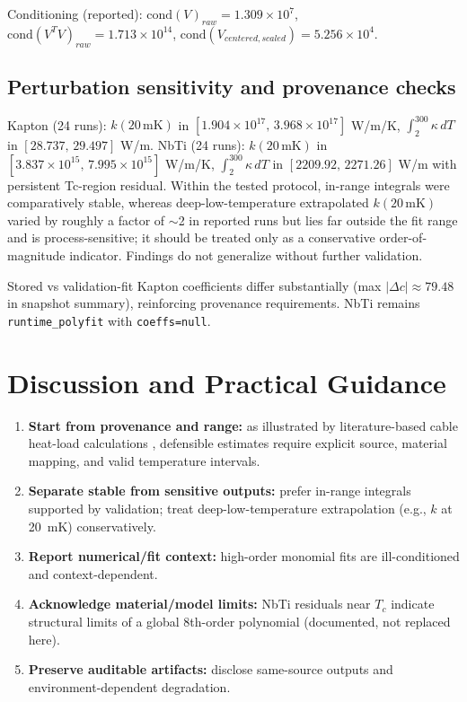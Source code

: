 \documentclass[11pt,a4paper]{article}
\begin{document}
Conditioning (reported): $\mathrm{cond}(V)_{raw}=1.309\times10^7$, $\mathrm{cond}(V^T V)_{raw}=1.713\times10^{14}$, $\mathrm{cond}(V_{centered,scaled})=5.256\times10^4$.

\subsection{Perturbation sensitivity and provenance checks}
Kapton (24 runs): $k(20\,\mathrm{mK})$ in $[1.904\times10^{17},\,3.968\times10^{17}]$ W/m/K, $\int_{2}^{300}\kappa\,dT$ in $[28.737,\,29.497]$ W/m. NbTi (24 runs): $k(20\,\mathrm{mK})$ in $[3.837\times10^{15},\,7.995\times10^{15}]$ W/m/K, $\int_{2}^{300}\kappa\,dT$ in $[2209.92,\,2271.26]$ W/m with persistent Tc-region residual. Within the tested protocol, in-range integrals were comparatively stable, whereas deep-low-temperature extrapolated $k(20\,\mathrm{mK})$ varied by roughly a factor of $\sim$2 in reported runs but lies far outside the fit range and is process-sensitive; it should be treated only as a conservative order-of-magnitude indicator. Findings do not generalize without further validation.

Stored vs validation-fit Kapton coefficients differ substantially (max $|\Delta c|\approx 79.48$ in snapshot summary), reinforcing provenance requirements. NbTi remains \texttt{runtime\_polyfit} with \texttt{coeffs=null}.

\section{Discussion and Practical Guidance}
\begin{enumerate}[leftmargin=*]
\item \textbf{Start from provenance and range:} as illustrated by literature-based cable heat-load calculations \cite{smith2024}, defensible estimates require explicit source, material mapping, and valid temperature intervals.
\item \textbf{Separate stable from sensitive outputs:} prefer in-range integrals supported by validation; treat deep-low-temperature extrapolation (e.g., $k$ at 20~mK) conservatively.
\item \textbf{Report numerical/fit context:} high-order monomial fits are ill-conditioned and context-dependent.
\item \textbf{Acknowledge material/model limits:} NbTi residuals near $T_c$ indicate structural limits of a global 8th-order polynomial (documented, not replaced here).
\item \textbf{Preserve auditable artifacts:} disclose same-source outputs and environment-dependent degradation.
\end{enumerate}
\end{document}
